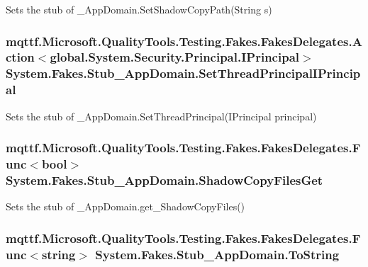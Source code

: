 Sets the stub of \-\_\-\-App\-Domain.\-Set\-Shadow\-Copy\-Path(\-String s)

\hypertarget{class_system_1_1_fakes_1_1_stub___app_domain_a9a56b04fd94aa38785fea2a424c16cdb}{
\subsubsection[{Set\-Thread\-Principal\-I\-Principal}]{\setlength{\rightskip}{0pt plus 5cm}mqttf.\-Microsoft.\-Quality\-Tools.\-Testing.\-Fakes.\-Fakes\-Delegates.\-Action$<$global.\-System.\-Security.\-Principal.\-I\-Principal$>$ System.\-Fakes.\-Stub\-\_\-\-App\-Domain.\-Set\-Thread\-Principal\-I\-Principal}}\label{class_system_1_1_fakes_1_1_stub___app_domain_a9a56b04fd94aa38785fea2a424c16cdb}


Sets the stub of \-\_\-\-App\-Domain.\-Set\-Thread\-Principal(\-I\-Principal principal)

\hypertarget{class_system_1_1_fakes_1_1_stub___app_domain_ae4e125c83952e86bfa0ba8145f80b388}{
\subsubsection[{Shadow\-Copy\-Files\-Get}]{\setlength{\rightskip}{0pt plus 5cm}mqttf.\-Microsoft.\-Quality\-Tools.\-Testing.\-Fakes.\-Fakes\-Delegates.\-Func$<$bool$>$ System.\-Fakes.\-Stub\-\_\-\-App\-Domain.\-Shadow\-Copy\-Files\-Get}}\label{class_system_1_1_fakes_1_1_stub___app_domain_ae4e125c83952e86bfa0ba8145f80b388}


Sets the stub of \-\_\-\-App\-Domain.\-get\-\_\-\-Shadow\-Copy\-Files()

\hypertarget{class_system_1_1_fakes_1_1_stub___app_domain_af58f774ad561eb2e596ebdad047d9a29}{
\subsubsection[{To\-String}]{\setlength{\rightskip}{0pt plus 5cm}mqttf.\-Microsoft.\-Quality\-Tools.\-Testing.\-Fakes.\-Fakes\-Delegates.\-Func$<$string$>$ System.\-Fakes.\-Stub\-\_\-\-App\-Domain.\-To\-String}}\label{class_system_1_1_fakes_1_1_stub___app_domain_af58f774ad561eb2e596ebdad047d9a29}


